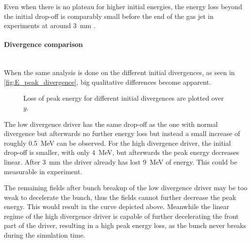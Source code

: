 \documentclass[bachelor_thesis]{subfiles}
\begin{document}
Even when there is no plateau for higher initial energies, the energy loss beyond the initial drop-off is comparably small before the end of the gas jet  in experiments at around \qty{3}{\mm} \cite{Schoebel2022}.

\paragraph*{Divergence comparison}\hspace{0pt} \\
When the same analysis is done on the different initial divergences, as seen in \autoref{fig:E_peak_divergence}, big qualitative differences become apparent. 
\begin{figure}
	\centering
	
	\caption{Loss of peak energy for different initial divergences are plotted over $y$.}
	\label{fig:E_peak_divergence}
\end{figure}
The low divergence driver has the same drop-off as the one with normal divergence but afterwards no further energy loss but instead a small increase of roughly \qty{0.5}{\MeV} can be observed.
For the high divergence driver, the initial drop-off is smaller, with only \qty{4}{\MeV}, but afterwards the peak energy decreases linear. After \qty{3}{\mm} the driver already has lost \qty{9}{\MeV} of energy. This could be measurable in experiment.

The remaining fields after bunch breakup of the low divergence driver may be too weak to decelerate the bunch, thus the fields cannot further decrease the peak energy. This would result in the curve depicted above. 
Meanwhile the linear regime of the high divergence driver is capable of further decelerating the front part of the driver, resulting in a high peak energy loss, as the bunch never breaks during the simulation time. 
\end{document}
